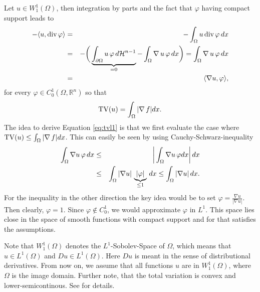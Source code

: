     \begin{example} %
    \label{prop:u_is_smooth}

        Let $u \in W_{1}^{1}(\Omega)$, then integration by parts and the fact that $\varphi$ having compact support leads to
            \begin{eqnarray}
                -\langle u, \textnormal{div}\,\varphi \rangle &=& - \int_{\Omega} u\, \textnormal{div}\, \varphi\, dx \notag \\
                &=& - \bigg( \underbrace{\int_{\partial\Omega} u\, \varphi\, d\mathcal{H}^{n-1}}_{= 0} - \int_{\Omega} \nabla\,u\, \varphi\, dx \bigg) = \int_{\Omega} \nabla\,u\,\varphi\,dx \notag \\
                &=& \langle \nabla u, \varphi \rangle,
                \label{eq:nabla_equals_minus_divergence}
            \end{eqnarray}
        for every $\varphi \in C^{1}_{0}(\Omega, \mathbb{R}^{n})$ so that
            \begin{equation}
                \textnormal{TV}(u) = \int_{\Omega} |\nabla\,f| dx.
                \label{eq:tvl1}
            \end{equation}
        The idea to derive Equation \ref{eq:tvl1} is that we first evaluate the case where\\
        $\textnormal{TV}(u) \le \int_{\Omega} |\nabla\,f| dx$. This can easily be seen by using Cauchy-Schwarz-inequality
            \begin{eqnarray}
                \int_{\Omega} \nabla u \, \varphi \, dx &\le& \bigg| \int_{\Omega} \nabla u \, \varphi dx \bigg| \, dx \notag \\
                &\le& \int_{\Omega} |\nabla u| \, \underbrace{|\varphi|}_{\le 1} \, dx \le \int_{\Omega} |\nabla u| \, dx.
            \end{eqnarray}
        For the inequality in the other direction the key idea would be to set $\varphi = \frac{\nabla u}{|\nabla u|}$. Then clearly, $\varphi = 1$. Since $\varphi \notin C_{0}^{1}$, we would approximate $\varphi$ in $L^{1}$. This space lies close in the space of smooth functions with compact support and for that satisfies the assumptions.

    \end{example}

    \begin{remark}
        Note that $W_{1}^{1}(\Omega)$ denotes the $L^{1}$-Sobolev-Space of $\Omega$, which means that $u \in L^{1}(\Omega)$ and $Du \in L^{1}(\Omega)$. Here $Du$ is meant in the sense of distributional derivatives. From now on, we assume that all functions $u$ are in $W_{1}^{1}(\Omega)$, where $\Omega$ is the image domain.%
        Further note, that the total variation is convex and lower-semicontinous. See \cite{Chambolle-et-al-10} for details.
    \end{remark}

